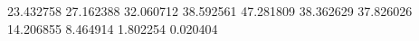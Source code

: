 23.432758
27.162388
32.060712
38.592561
47.281809
38.362629
37.826026
14.206855
8.464914
1.802254
0.020404
